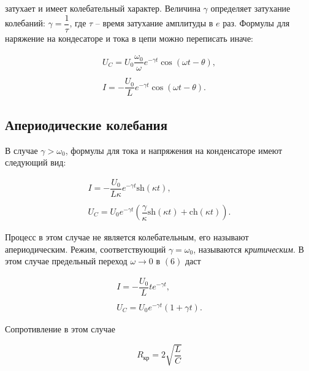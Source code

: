 затухает и имеет колебательный характер. Величина $\gamma$ определяет затухание колебаний: $\gamma = \dfrac{1}{\tau}$, где $\tau$ -- время затухание амплитуды в $e$ раз.
Формулы для наряжение на кондесаторе и тока в цепи можно переписать иначе:

\begin{equation}
    \begin{array}{c}
        U_C = U_0 \dfrac{\omega_0}{\omega}e^{-\gamma t} \cos(\omega t - \theta),\\
        \\
        I = -\dfrac{U_0}{L}e^{-\gamma t} \cos(\omega t - \theta).
    \end{array}
\end{equation}

\subsection{Апериодические колебания}

В случае $\gamma > \omega_0$, формулы для тока и напряжения на конденсаторе имеют следующий вид:

\begin{equation}
    \begin{array}{c}
        I = -\dfrac{U_0}{L\kappa}e^{-\gamma t}\text{sh}(\kappa t),\\
        \\
        U_C = U_0 e^{-\gamma t}\left( \dfrac{\gamma}{\kappa}\text{sh}(\kappa t) + \text{ch}(\kappa t) \right).
    \end{array}
\end{equation}

Процесс в этом случае не является колебательным, его называют апериодическим. Режим, соответствующий $\gamma = \omega_0$, называются \textit{критическим}. В этом случае предельный переход $\omega \rightarrow 0$ в $(6)$ даст 

\begin{equation}
    \begin{array}{c}
        I = -\dfrac{U_0}{L}te^{-\gamma t},\\
        \\
        U_C=U_0 e^{-\gamma t}(1+\gamma t).
    \end{array}
\end{equation}

Сопротивление в этом случае 

\begin{equation}
    R_{\text{кр}}= 2 \sqrt{\dfrac{L}{C}}
\end{equation}

